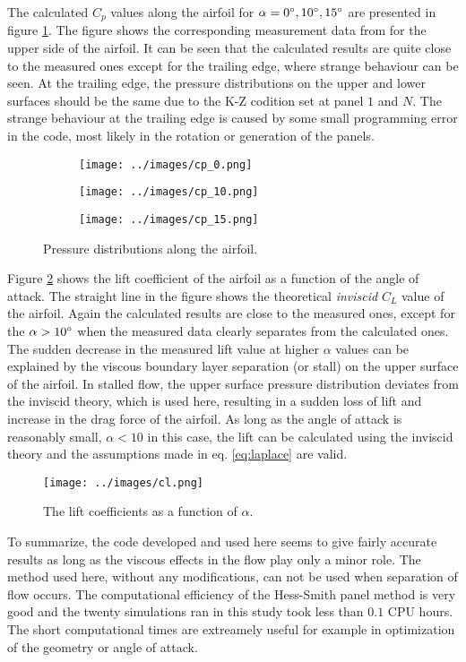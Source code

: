 \documentclass[a4paper,12pt]{article}
\begin{document}
The calculated $C_p$ values along the airfoil for $\alpha = 0\degree, 10\degree, 15\degree$ are presented in figure \ref{fig:cp}. The figure shows the corresponding measurement data from \cite{NASA} for the upper side of the airfoil. It can be seen that the calculated results are quite close to the measured ones except for the trailing edge, where strange behaviour can be seen. At the trailing edge, the pressure distributions on the upper and lower surfaces should be the same due to the K-Z codition set at panel $1$ and $N$. The strange behaviour at the trailing edge is caused by some small programming error in the code, most likely in the rotation or generation of the panels.

\begin{figure}[H]
\centering
\begin{subfigure}{.48\textwidth}
  \centering
  \texttt{[image: ../images/cp\_0.png]}
\end{subfigure}
\begin{subfigure}{.48\textwidth}
  \centering
  \texttt{[image: ../images/cp\_10.png]}
\end{subfigure}
\begin{subfigure}{.48\textwidth}
  \centering
  \texttt{[image: ../images/cp\_15.png]}
\end{subfigure}
\caption{Pressure distributions along the airfoil.}
\label{fig:cp}
\end{figure}

Figure \ref{fig:cl} shows the lift coefficient of the airfoil as a function of the angle of attack. The straight line in the figure shows the theoretical \emph{inviscid} $C_L$ value of the airfoil.  Again the calculated results are close to the measured ones, except for the $\alpha > 10\degree$ when the measured data clearly separates from the calculated ones. The sudden decrease in the measured lift value at higher $\alpha$ values can be explained by the viscous boundary layer separation (or stall) on the upper surface of the airfoil. In stalled flow, the upper surface pressure distribution deviates from the inviscid theory, which is used here, resulting in a sudden loss of lift and increase in the drag force of the airfoil\cite{White}. As long as the angle of attack is reasonably small, $\alpha < 10$ in this case, the lift can be calculated using the inviscid theory and the assumptions made in eq. \ref{eq:laplace} are valid. 
\begin{figure}[H]
\centering
  \texttt{[image: ../images/cl.png]}
\caption{The lift coefficients as a function of $\alpha$.}
\label{fig:cl}
\end{figure}
To summarize, the code developed and used here seems to give fairly accurate results as long as the viscous effects in the flow play only a minor role. The method used here, without any modifications, can not be used when separation of flow occurs. The computational efficiency of the Hess-Smith panel method is very good and the twenty simulations ran in this study took less than $0.1$ CPU hours. The short computational times are extreamely useful for example in optimization of the geometry or angle of attack.
\end{document}
